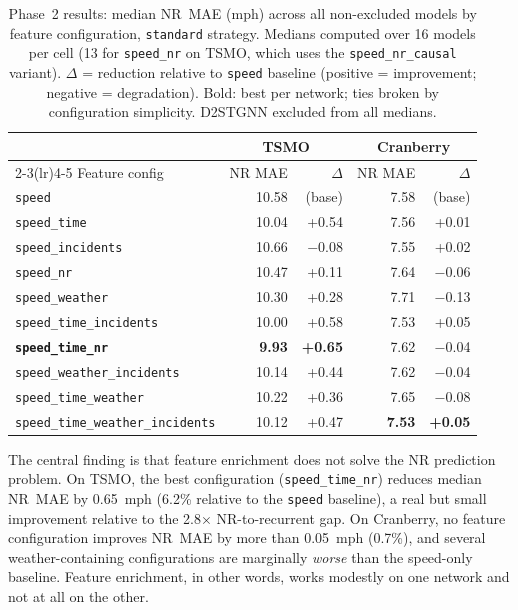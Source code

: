 \documentclass[a4paper]{cas-sc}
\begin{document}
\begin{table}[htbp]
\centering
\caption{Phase~2 results: median NR~MAE (mph) across all non-excluded
         models by feature configuration, \texttt{standard} strategy.
         Medians computed over 16 models per cell (13 for
         \texttt{speed\_nr} on TSMO, which uses the
         \texttt{speed\_nr\_causal} variant).
         $\Delta$ = reduction relative to \texttt{speed} baseline
         (positive = improvement; negative = degradation).
         Bold: best per network; ties broken by configuration simplicity.
         D2STGNN excluded from all medians.}
\label{tab:phase2_summary}
\small
\begin{tabular}{lrr rr}
\toprule
 & \multicolumn{2}{c}{TSMO} & \multicolumn{2}{c}{Cranberry} \\
\cmidrule(lr){2-3}\cmidrule(lr){4-5}
Feature config & NR MAE & $\Delta$ & NR MAE & $\Delta$ \\
\midrule
\texttt{speed}                       & 10.58 & (base) &  7.58 & (base) \\
\texttt{speed\_time}                 & 10.04 & +0.54  &  7.56 & +0.01  \\
\texttt{speed\_incidents}            & 10.66 & $-$0.08 & 7.55 & +0.02  \\
\texttt{speed\_nr}                   & 10.47 & +0.11  &  7.64 & $-$0.06 \\
\texttt{speed\_weather}              & 10.30 & +0.28  &  7.71 & $-$0.13 \\
\texttt{speed\_time\_incidents}      & 10.00 & +0.58  &  7.53 & +0.05  \\
\textbf{\texttt{speed\_time\_nr}}    & \textbf{9.93} & \textbf{+0.65} & 7.62 & $-$0.04 \\
\texttt{speed\_weather\_incidents}   & 10.14 & +0.44  &  7.62 & $-$0.04 \\
\texttt{speed\_time\_weather}        & 10.22 & +0.36  &  7.65 & $-$0.08 \\
\texttt{speed\_time\_weather\_incidents} & 10.12 & +0.47 & \textbf{7.53} & \textbf{+0.05} \\
\bottomrule
\end{tabular}
\end{table}

The central finding is that feature enrichment does not solve the
NR prediction problem.
On TSMO, the best configuration (\texttt{speed\_time\_nr}) reduces
median NR~MAE by 0.65~mph (6.2\% relative to the \texttt{speed}
baseline), a real but small improvement relative to the 2.8$\times$
NR-to-recurrent gap.
On Cranberry, no feature configuration improves NR~MAE by more than
0.05~mph (0.7\%), and several weather-containing configurations are
marginally \emph{worse} than the speed-only baseline.
Feature enrichment, in other words, works modestly on one network
and not at all on the other.
\end{document}
